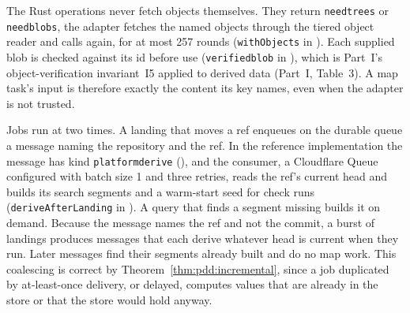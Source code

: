 \documentclass[11pt,letterpaper]{article}
\theoremstyle{definition}
\theoremstyle{remark}
\DeclareRobustCommand{\code}[1]{{\def\_{\textunderscore\allowbreak}\texttt{#1}}}
\begin{document}
The Rust operations never fetch objects themselves. They return \code{need\_trees} or \code{need\_blobs}, the adapter fetches the named objects through the tiered object reader and calls again, for at most 257 rounds (\code{withObjects} in ). Each supplied blob is checked against its id before use (\code{verified\_blob} in ), which is Part~I's object-verification invariant~I5 applied to derived data (Part~I, Table~3). A map task's input is therefore exactly the content its key names, even when the adapter is not trusted.

Jobs run at two times. A landing that moves a ref enqueues on the durable queue a message naming the repository and the ref. In the reference implementation the message has kind \code{platform\_derive} (), and the consumer, a Cloudflare Queue configured with batch size 1 and three retries, reads the ref's current head and builds its search segments and a warm-start seed for check runs (\code{deriveAfterLanding} in ). A query that finds a segment missing builds it on demand. Because the message names the ref and not the commit, a burst of landings produces messages that each derive whatever head is current when they run. Later messages find their segments already built and do no map work. This coalescing is correct by Theorem~\ref{thm:pdd:incremental}, since a job duplicated by at-least-once delivery, or delayed, computes values that are already in the store or that the store would hold anyway.
\end{document}
